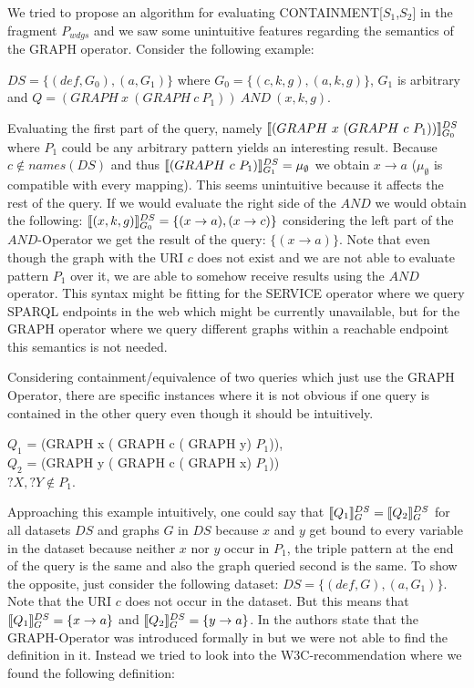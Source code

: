 			We tried to propose an algorithm for evaluating CONTAINMENT[$S_1$,$S_2$] in the
			fragment $P_{wdgs}$ and we saw some unintuitive features regarding the semantics of the
			GRAPH operator. Consider the following example:
			\begin{example}
				$DS=\{(def,G_0), (a,G_1) \}$ where $G_0 = \{
				(c,k,g), (a,k,g) \}$, $G_1$ is arbitrary and  $Q = (GRAPH \ x  \
				(GRAPH  \ c \  P_1)) \ AND \ (x,k,g)$.
			\end{example}

			Evaluating the first part of the query, namely $\llbracket(GRAPH \ x  \ (GRAPH  \
			c \  P_1))\rrbracket^{DS}_{G_0} $ where $P_1$ could be any arbitrary
			pattern yields an interesting result. Because $c \notin	names(DS)$ 
			and thus $\llbracket (GRAPH \ c  \ P_1) \rrbracket^{DS}_{G_1} = \mu_\emptyset$  we
			obtain $x \rightarrow a$ ($\mu_\emptyset$ is compatible with every
			mapping). This seems unintuitive because it affects the rest of the query.
			If we would evaluate the right side of the $AND$ we would obtain the
			following: $\llbracket(x,k,g)\rrbracket^{DS}_{G_0} = \{ (x \rightarrow a) , (x \rightarrow c) \}$ considering the
			left part of the $AND$-Operator we get the result of the query: $\{ (x \rightarrow a )
			\}$. Note that even though the graph with the URI $c$ does not exist and we are not able
			to evaluate pattern $P_1$ over it, we are able to somehow receive results using
			the $AND$ operator. This syntax might be fitting for the SERVICE
			operator where we query SPARQL endpoints in the web which might be
			currently unavailable, but for the GRAPH operator where we query
			different graphs within a reachable endpoint
			this semantics is not needed.
			\bigskip

			\noindent Considering containment/equivalence of two queries which just use the GRAPH
			Operator, there are specific instances where it is not obvious if one query is contained in the other query even though it should be intuitively.

			\begin{example}
				$Q_1$ = (GRAPH x ( GRAPH c ( GRAPH y) $P_1$)),\\ 
				$Q_2$ = (GRAPH y ( GRAPH c ( GRAPH x) $ P_1$))\\
				$?X,?Y \notin P_1$.
			\end{example}

			Approaching this example intuitively, one could say that $\llbracket Q_1
			\rrbracket^{DS}_{G} = \llbracket Q_2 \rrbracket^{DS}_G$ for all datasets $DS$ and graphs
			$G$ in $DS$ because $x$ and $y$ get bound to every variable in the dataset because neither
			$x$ nor $y$ occur in $P_1$, the triple pattern at the end
			of the query is the same and also the graph queried second is the same. 
			To show the opposite, just  consider the following dataset:
			$DS=\{(def,G), (a,G_1)\}$. Note that the URI $c$ does not occur in the dataset.
			But this means that $\llbracket Q_1 \rrbracket^{DS}_G = \{x \rightarrow a\}$ and  $\llbracket Q_2
			\rrbracket^{DS}_G = \{y \rightarrow a\}$.			
			In \cite{BuilAranda20131} the authors
			state that the GRAPH-Operator was introduced formally
			in \cite{perez2009semantics} but we were not able to find the definition
			in it.
			Instead we tried to look into the W3C-recommendation\cite{w3standard} 
			where we found the following definition:

